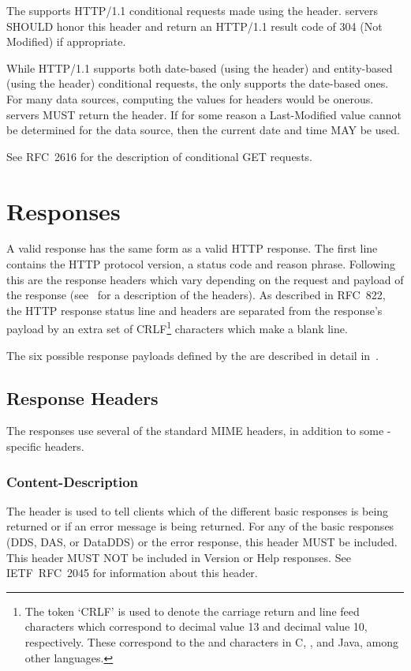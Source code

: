 \documentclass[justify]{nasa-ese}
\begin{document}
The \DAP supports HTTP/1.1 conditional requests made using the
 header. \DAP servers SHOULD honor this header
and return an HTTP/1.1 result code of 304 (Not Modified) if
appropriate. 

While HTTP/1.1 supports both date-based (using the 
header) and entity-based (using the  header) conditional
requests, the \DAP only supports the date-based ones. For many data
sources, computing the values for  headers would be onerous.
\DAP servers MUST return the  header. If for some
reason a Last-Modified value cannot be determined for the data source,
then the current date and time MAY be used.

See RFC~2616\cite{rfc2616} for the description of
conditional GET requests.

\section{Responses}
\label{sec-responses}

A valid \DAP response has the same form as a valid \ac{HTTP} response.
The first line contains the \ac{HTTP} protocol version, a status code
and reason phrase\cite{rfc2616}. Following this are the response
headers which vary depending on the request and payload of the
response (see~ for a description of the
headers). As described in RFC~822\cite{rfc822}, the \ac{HTTP} response
status line and headers are separated from the response's payload by
an extra set of CRLF\footnote{The token `CRLF' is used to denote the
  carriage return and line feed characters which correspond to decimal
  value 13 and decimal value 10, respectively. These correspond to the
  \lit{\\r} and \lit{\\n} characters in C, \Cpp, and Java, among other
  languages.} characters which make a blank line.

The six possible response payloads defined by the \DAP are described
in detail in~.

\subsection{Response Headers}
\label{sec-resp-headers}

The \DAP responses use several of the standard MIME headers, in
addition to some \DAP-specific headers.

\subsubsection{Content-Description}
The  header is used to tell clients which of the
different basic responses is being returned or if an error message is being
returned. For any of the basic responses (\ac{DDS}, \ac{DAS}, or
\ac{DataDDS}) or the error response, this header MUST be included. This
header MUST NOT be included in Version or Help responses. See
IETF~RFC~2045\cite{rfc2045} for information about this header.
\end{document}
